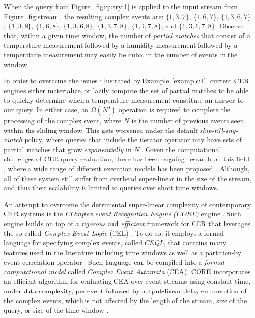 \begin{example}
When the query from Figure~\ref{fig:query:1} is applied to the input stream from Figure~\ref{fig:stream}, the resulting complex events are: $\{ 1, 3, 7 \}$, $\{ 1, 6, 7 \}$, $\{ 1, 3, 6, 7 \}$, $\{ 1, 3, 8 \}$, $\{ 1, 6, 8 \}$, $\{ 1, 3, 6, 8 \}$, $\{ 1, 3, 7, 8\}$, $\{ 1, 6, 7, 8\}$, and $\{ 1, 3, 6, 7, 8\}$. Observe that, within a given time window, the number of \emph{partial matches} that consist of a temperature measurement followed by a humidity measurement followed by a temperature measurement may easily be cubic in the number of events in the window.
\end{example}

In order to overcome the issues illustrated by Example~\ref{example:1}, current CER engines either materialize, or lazily compute the set of partial matches to be able to quickly determine when a temperature measurement constitute an answer to our query. In either case, an $\Omega(N^{3})$ operation is required to complete the processing of the complex event, where $N$ is the number of previous events seen within the sliding window. This gets worsened under the default \emph{skip-till-any-match} \cite{skip-till-any-match} policy, where queries that include the iterator operator may have sets of partial matches that grow \emph{exponentially} in $N$ \cite{core}.  Given the computational challenges of CER query evaluation, there has been ongoing research on this field \cite{research-evaluation-query, formal-framework-cer}, where a wide range of different execution models has been proposed \cite{survey-systems-1, survey-systems-2}. Although, all of these system still suffer from overhead super-linear in the size of the stream, and thus their scalability is limited to queries over short time windows.

An attempt to overcome the detrimental super-linear complexity of contemporary CER systems is the \emph{COmplex event Recognition Engine (CORE)} engine \cite{core}. Such engine builds on top of a \emph{rigorous} and \emph{efficient} framework for CER that leverages the so called \emph{Complex Event Logic} (CEL) \cite{formal-framework-cep, formal-framework-cer}. To do so, it employs a formal language for specifying complex events, called \emph{CEQL}, that contains many features used in the literature including time windows as well as a partition-by event correlation operator \cite{on-the-expressiveness, core}. Such language can be compiled into a \emph{formal computational model} called \emph{Complex Event Automata} (CEA). CORE incorporates an efficient algorithm for evaluating CEA over event streams using constant time, under data complexity, per event followed by output-linear delay enumeration of the complex events, which is not affected by the length of the stream, size of the query, or size of the time window \cite{formal-framework-cer, core}.

